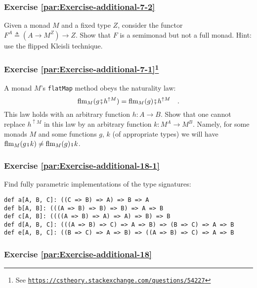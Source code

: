 \subsubsection{Exercise \label{par:Exercise-additional-7-2}\ref{par:Exercise-additional-7-2}}

Given a monad $M$ and a fixed type $Z$, consider the functor $F^{A}\triangleq(A\rightarrow M^{Z})\rightarrow Z$.
Show that $F$ is a semimonad but not a full monad. Hint: use the
flipped Kleisli technique.

\subsubsection{Exercise \label{par:Exercise-additional-7-1}\ref{par:Exercise-additional-7-1}\protect\footnote{See \texttt{\protect\href{https://cstheory.stackexchange.com/questions/54227}{https://cstheory.stackexchange.com/questions/54227}}}}

A monad $M$\textsf{'}s \lstinline!flatMap! method obeys the naturality law:
\[
\text{flm}_{M}(g\bef h^{\uparrow M})=\text{flm}_{M}(g)\bef h^{\uparrow M}\quad.
\]
This law holds with an arbitrary function $h:A\rightarrow B$. Show
that one cannot replace $h^{\uparrow M}$ in this law by an arbitrary
function $k:M^{A}\rightarrow M^{B}$. Namely, for some monads $M$
and some functions $g$, $k$ (of appropriate types) we will have
$\text{flm}_{M}(g\bef k)\neq\text{flm}_{M}(g)\bef k$.

\subsubsection{Exercise \label{par:Exercise-additional-18-1}\ref{par:Exercise-additional-18-1}}

Find fully parametric implementations of the type signatures:

\begin{lstlisting}
def a[A, B, C]: ((C => B) => A) => B => A
def b[A, B]: (((A => B) => B) => B) => A => B
def c[A, B]: ((((A => B) => A) => A) => B) => B
def d[A, B, C]: (((A => B) => C) => A => B) => (B => C) => A => B
def e[A, B, C]: ((B => C) => A => B) => ((A => B) => C) => A => B
\end{lstlisting}


\subsubsection{Exercise \label{par:Exercise-additional-18}\ref{par:Exercise-additional-18}}

